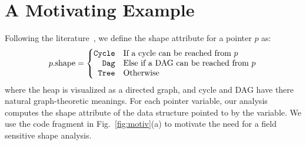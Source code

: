 \documentclass[letterpaper]{sig-alternate}
\newcommand{\p}{\ensuremath{p}}
\newcommand{\shape}{\mbox{shape}}
\newcommand{\Tree}{{\tt Tree}}
\newcommand{\Dag}{{\tt Dag}}
\newcommand{\Cycle}{{\tt Cycle}}
\begin{document}
\section{A Motivating Example}\label{sec:motiv}

Following the
literature~\cite{Ghiya96,Sagiv96,marron06static},
we define the shape attribute for a pointer $\p$
as:
\begin{eqnarray*}
  \p.\shape = \left\{ \begin{array}{@{}rl@{}}
    \Cycle & \mbox{If a cycle can be reached from $\p$} \\ 
    \Dag & \mbox{Else if a DAG can be reached from $\p$} \\
    \Tree & \mbox{Otherwise} \\
  \end{array} \right.
\end{eqnarray*}
where the heap is visualized as a directed graph, and cycle
and DAG have there natural graph-theoretic meanings. For each
pointer variable, our analysis computes the shape attribute
of the data structure pointed to by the variable. We use the
code fragment in Fig.~\ref{fig:motiv}(a) to motivate the need
for a field sensitive shape analysis.
\end{document}
